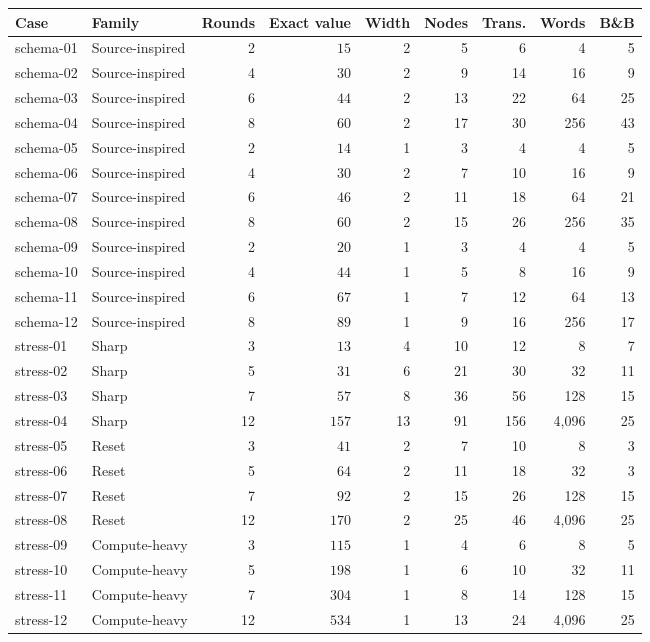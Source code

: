 \begin{tabular}{llrrrrrrr}
\toprule
Case & Family & Rounds & Exact value & Width & Nodes & Trans. & Words & B\&B\\\midrule
schema-01 & Source-inspired & 2 & $15$ & 2 & 5 & 6 & 4 & 5\\
schema-02 & Source-inspired & 4 & $30$ & 2 & 9 & 14 & 16 & 9\\
schema-03 & Source-inspired & 6 & $44$ & 2 & 13 & 22 & 64 & 25\\
schema-04 & Source-inspired & 8 & $60$ & 2 & 17 & 30 & 256 & 43\\
schema-05 & Source-inspired & 2 & $14$ & 1 & 3 & 4 & 4 & 5\\
schema-06 & Source-inspired & 4 & $30$ & 2 & 7 & 10 & 16 & 9\\
schema-07 & Source-inspired & 6 & $46$ & 2 & 11 & 18 & 64 & 21\\
schema-08 & Source-inspired & 8 & $60$ & 2 & 15 & 26 & 256 & 35\\
schema-09 & Source-inspired & 2 & $20$ & 1 & 3 & 4 & 4 & 5\\
schema-10 & Source-inspired & 4 & $44$ & 1 & 5 & 8 & 16 & 9\\
schema-11 & Source-inspired & 6 & $67$ & 1 & 7 & 12 & 64 & 13\\
schema-12 & Source-inspired & 8 & $89$ & 1 & 9 & 16 & 256 & 17\\
stress-01 & Sharp & 3 & $13$ & 4 & 10 & 12 & 8 & 7\\
stress-02 & Sharp & 5 & $31$ & 6 & 21 & 30 & 32 & 11\\
stress-03 & Sharp & 7 & $57$ & 8 & 36 & 56 & 128 & 15\\
stress-04 & Sharp & 12 & $157$ & 13 & 91 & 156 & 4,096 & 25\\
stress-05 & Reset & 3 & $41$ & 2 & 7 & 10 & 8 & 3\\
stress-06 & Reset & 5 & $64$ & 2 & 11 & 18 & 32 & 3\\
stress-07 & Reset & 7 & $92$ & 2 & 15 & 26 & 128 & 15\\
stress-08 & Reset & 12 & $170$ & 2 & 25 & 46 & 4,096 & 25\\
stress-09 & Compute-heavy & 3 & $115$ & 1 & 4 & 6 & 8 & 5\\
stress-10 & Compute-heavy & 5 & $198$ & 1 & 6 & 10 & 32 & 11\\
stress-11 & Compute-heavy & 7 & $304$ & 1 & 8 & 14 & 128 & 15\\
stress-12 & Compute-heavy & 12 & $534$ & 1 & 13 & 24 & 4,096 & 25\\

\end{tabular}
